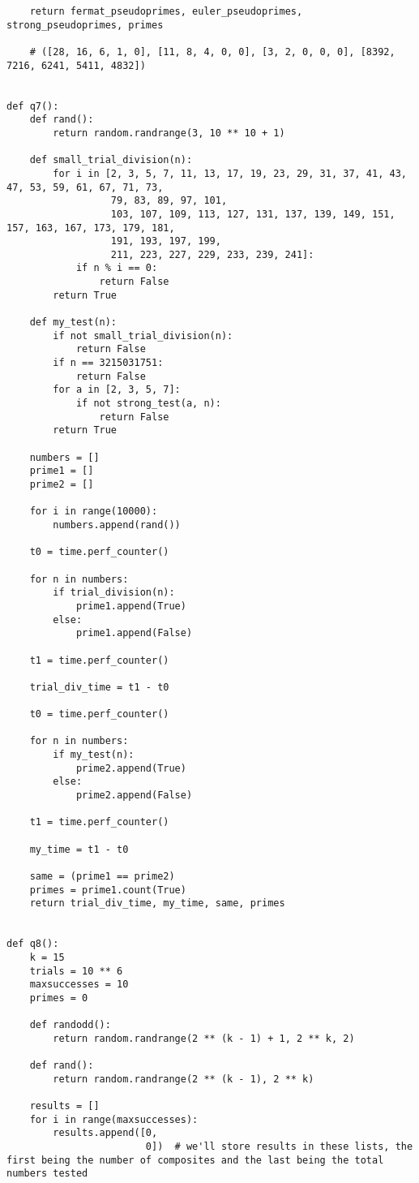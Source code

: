 \documentclass[10pt,a4paper]{report}
\begin{document}
\begin{verbatim}
    return fermat_pseudoprimes, euler_pseudoprimes, strong_pseudoprimes, primes

    # ([28, 16, 6, 1, 0], [11, 8, 4, 0, 0], [3, 2, 0, 0, 0], [8392, 7216, 6241, 5411, 4832])


def q7():
    def rand():
        return random.randrange(3, 10 ** 10 + 1)

    def small_trial_division(n):
        for i in [2, 3, 5, 7, 11, 13, 17, 19, 23, 29, 31, 37, 41, 43, 47, 53, 59, 61, 67, 71, 73,
                  79, 83, 89, 97, 101,
                  103, 107, 109, 113, 127, 131, 137, 139, 149, 151, 157, 163, 167, 173, 179, 181,
                  191, 193, 197, 199,
                  211, 223, 227, 229, 233, 239, 241]:
            if n % i == 0:
                return False
        return True

    def my_test(n):
        if not small_trial_division(n):
            return False
        if n == 3215031751:
            return False
        for a in [2, 3, 5, 7]:
            if not strong_test(a, n):
                return False
        return True

    numbers = []
    prime1 = []
    prime2 = []

    for i in range(10000):
        numbers.append(rand())

    t0 = time.perf_counter()

    for n in numbers:
        if trial_division(n):
            prime1.append(True)
        else:
            prime1.append(False)

    t1 = time.perf_counter()

    trial_div_time = t1 - t0

    t0 = time.perf_counter()

    for n in numbers:
        if my_test(n):
            prime2.append(True)
        else:
            prime2.append(False)

    t1 = time.perf_counter()

    my_time = t1 - t0

    same = (prime1 == prime2)
    primes = prime1.count(True)
    return trial_div_time, my_time, same, primes


def q8():
    k = 15
    trials = 10 ** 6
    maxsuccesses = 10
    primes = 0

    def randodd():
        return random.randrange(2 ** (k - 1) + 1, 2 ** k, 2)

    def rand():
        return random.randrange(2 ** (k - 1), 2 ** k)

    results = []
    for i in range(maxsuccesses):
        results.append([0,
                        0])  # we'll store results in these lists, the first being the number of composites and the last being the total numbers tested


\end{verbatim}
\end{document}

